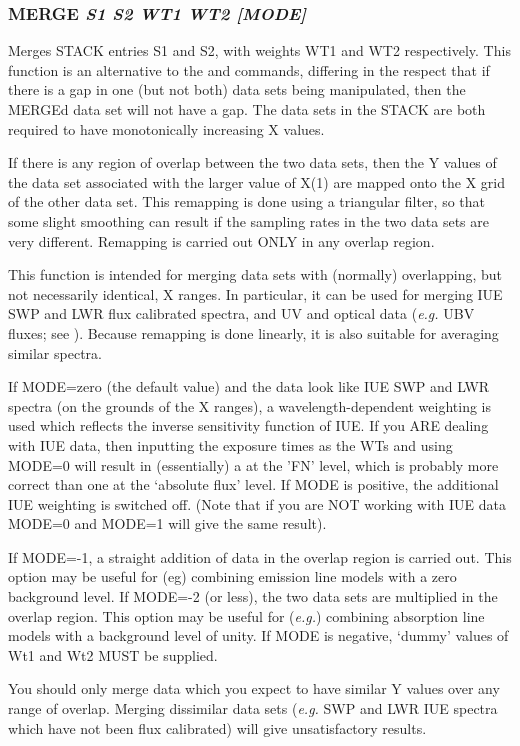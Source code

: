 \documentclass[twoside,11pt,noabs,nolof]{starlink}
\providecommand{\dipcom}[3]{\subsubsection*{\label{COM:#1}\textbf{#1} \emph{#2}}}
\begin{document}
\dipcom{MERGE}{S1 S2 WT1 WT2 [MODE]}{Merges two arrays }
Merges STACK entries S1 and S2, with weights WT1 and WT2 respectively.
This function is an alternative to the   and   commands,
differing in the respect that if there is a gap in one (but not both)
data sets being manipulated, then the MERGEd data set will not have a
gap. The data sets in the STACK are both required to have monotonically
increasing X values.

If there is any region of overlap between the two data sets, then the Y
values of the data set associated with the larger value of X(1) are
mapped onto the X grid of the other data set. This remapping is done
using a triangular filter, so that some slight smoothing can result if
the sampling rates in the two data sets are very different. Remapping
is carried out ONLY in any overlap region.

This function is intended for merging data sets with (normally)
overlapping, but not necessarily identical, X ranges. In particular,
it can be used for merging IUE SWP and LWR flux calibrated spectra,
and UV and optical data (\emph{e.g.} UBV fluxes; see ).  Because
remapping is done linearly, it is also suitable for averaging similar
spectra.

If MODE=zero (the default value) and the data look like IUE SWP and
LWR spectra (on the grounds of the X ranges), a wavelength-dependent
weighting is used which reflects the inverse sensitivity function of
IUE. If you ARE dealing with IUE data, then inputting the exposure
times as the WTs and using MODE=0 will result in (essentially) a 
at the 'FN' level, which is probably more correct than one at the
`absolute flux' level. If MODE is positive, the additional IUE
weighting is switched off. (Note that if you are NOT working with IUE
data MODE=0 and MODE=1 will give the same result).

If MODE=-1, a straight addition of data in the overlap region is
carried out. This option may be useful for (eg) combining emission
line models with a zero background level. If MODE=-2 (or less), the
two data sets are multiplied in the overlap region. This option may be
useful for (\emph{e.g.}) combining absorption line models with a
background level of unity. If MODE is negative, `dummy' values of Wt1
and Wt2 MUST be supplied.

You should only merge data which you expect to have similar Y values
over any range of overlap. Merging dissimilar data sets (\emph{e.g.} SWP
and LWR IUE spectra which have not been flux calibrated) will give
unsatisfactory results.
\end{document}
